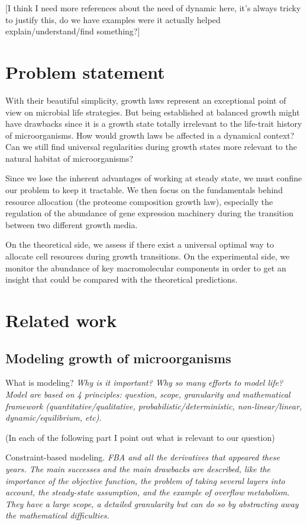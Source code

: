 [I think I need more references about the need of dynamic here, it's always tricky to justify this, do we have examples were it actually helped explain/understand/find something?]

\section{Problem statement}

With their beautiful simplicity, growth laws represent an exceptional point of view on microbial life strategies.
But being established at balanced growth might have drawbacks since it is a growth state totally irrelevant to the life-trait history of microorganisms.
How would growth laws be affected in a dynamical context?
Can we still find universal regularities during growth states more relevant to the natural habitat of microorganisms?

Since we lose the inherent advantages of working at steady state, we must confine our problem to keep it tractable.
We then focus on the fundamentals behind resource allocation (the proteome composition growth law), especially the regulation of the abundance of gene expression machinery during the transition between two different growth media.

On the theoretical side, we assess if there exist a universal optimal way to allocate cell resources during growth transitions.
On the experimental side, we monitor the abundance of key macromolecular components in order to get an insight that could be compared with the theoretical predictions.

\section{Related work}

\subsection{Modeling growth of microorganisms}

What is modeling?
\textit{Why is it important?
Why so many efforts to model life?
Model are based on 4 principles: question, scope, granularity and mathematical framework (quantitative/qualitative, probabilistic/deterministic, non-linear/linear, dynamic/equilibrium, etc).}

(In each of the following part I point out what is relevant to our question)

Constraint-based modeling.
\textit{FBA and all the derivatives that appeared these years.
The main successes and the main drawbacks are described, like the importance of the objective function, the problem of taking several layers into account, the steady-state assumption, and the example of overflow metabolism.
They have a large scope, a detailed granularity but can do so by abstracting away the mathematical difficulties.}

